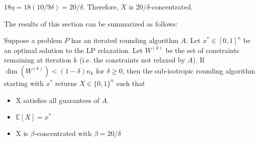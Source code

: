 $18\eta = 18(10/9\delta) = 20/\delta$. Therefore, $X$ is $20/\delta$-concentrated.

The results of this section can be summarized as follows:
\begin{theorem}\label{thm:sub-isotropic}
Suppose a problem $P$ has an iterated rounding algorithm $A$.
Let $x^* \in [0, 1]^n$ be an optimal solution to the LP relaxation.
Let $W^{(k)}$ be the set of constraints remaining at iteration $k$
(i.e. the constraints not relaxed by $A$).
If $\dim(W^{(k)}) < (1-\delta)n_k$ for $\delta \ge 0$,
then the sub-isotropic rounding algorithm starting with $x^*$
returns $X \in \{0,1\}^n$ such that
\begin{itemize}
    \item X satisfies all guarantees of $A$.
    \item $\mathbb{E}[X] = x^*$
    \item X is $\beta$-concentrated with $\beta = 20/\delta$
\end{itemize}
\end{theorem}
